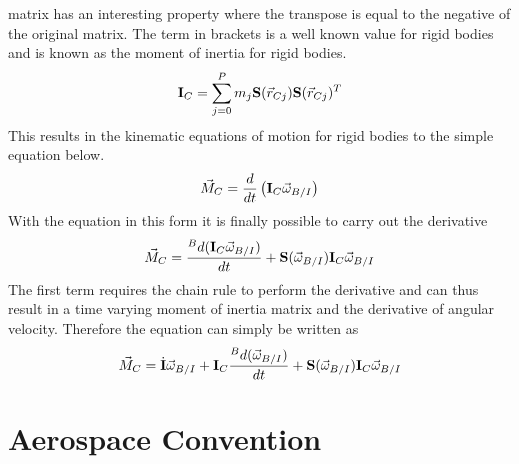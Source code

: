 \documentclass{article}
\begin{document}
matrix has an interesting property where the transpose is equal to the
negative of the original matrix. The term in brackets is a well known
value for rigid bodies and is known as the moment of inertia for rigid
bodies. 
\begin{equation}
{\bf I}_C =  \sum\limits_{j=0}^P m_j{\bf S}(\vec{r}_{Cj}){\bf
  S}(\vec{r}_{Cj})^T
\end{equation}
This results in the kinematic equations of motion for rigid bodies to
the simple equation below.
\begin{equation}
\vec{M}_C =  \frac{d}{dt}\left({\bf I}_C\vec{\omega}_{B/I} \right)
\end{equation}
With the equation in this form it is finally possible to carry out the
derivative
\begin{equation}
\vec{M}_C = \frac{{}^Bd ({\bf I}_C\vec{\omega}_{B/I})}{dt} + {\bf
  S}(\vec{\omega}_{B/I}){\bf I}_C\vec{\omega}_{B/I}
\end{equation}
The first term requires the chain rule to perform the derivative and
can thus result in a time varying moment of inertia matrix and the
derivative of angular velocity. Therefore the equation can simply be written as
\begin{equation}
\vec{M}_C = \dot{{\bf I}}\vec{\omega}_{B/I} + {\bf I}_C\frac{{}^Bd (\vec{\omega}_{B/I})}{dt} + {\bf
  S}(\vec{\omega}_{B/I}){\bf I}_C\vec{\omega}_{B/I}
\end{equation}

\section{Aerospace Convention}
\end{document}
